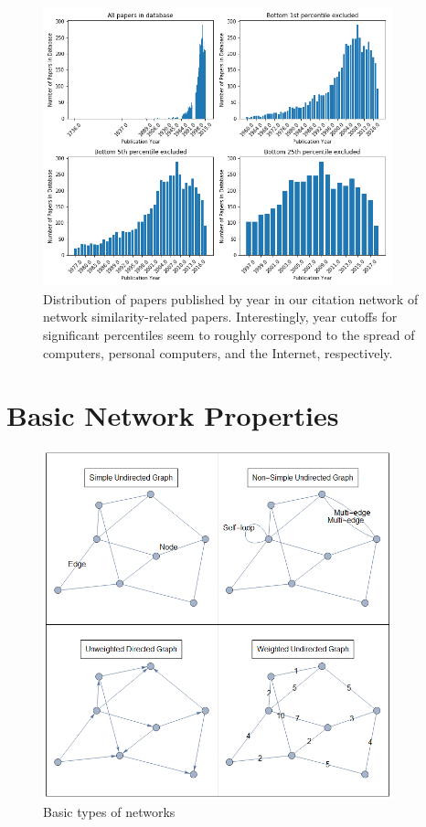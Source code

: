 \documentclass[12pt]{thesis}
\theoremstyle{plain}
\theoremstyle{definition}
\theoremstyle{remark}
\begin{document}
\begin{figure}[h!]
\centering
\includegraphics[width=0.9\textwidth]{year_distribution.png}
\caption{Distribution of papers published by year in our citation network of network similarity-related papers. Interestingly, year cutoffs for significant percentiles seem to roughly correspond to the spread of computers, personal computers, and the Internet, respectively.}
\label{fig:year_distributions}
\end{figure}








\section{Basic Network Properties}

\begin{figure}[h]
\centering
\includegraphics[width=0.9\textwidth]{basic_properties_demo.png}
\caption{Basic types of networks}
\label{fig:basic_properties_demo}
\end{figure}
\end{document}
